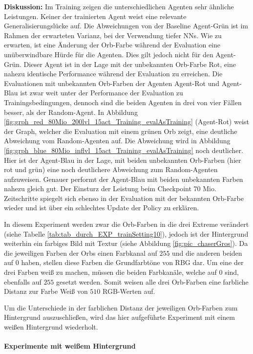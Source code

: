 \textbf{Diskussion:} Im Training zeigen die unterschiedlichen Agenten sehr ähnliche Leistungen. Keiner der trainierten Agent weist eine relevante Generalisierungslücke auf. Die Abweichungen von der Baseline Agent-Grün ist im Rahmen der erwarteten Varianz, bei der Verwendung tiefer NNs. Wie zu erwarten, ist eine Änderung der Orb-Farbe während der Evaluation eine unüberwindbare Hürde für die Agenten. Dies gilt jedoch nicht für den Agent-Grün. Dieser Agent ist in der Lage mit der unbekannten Orb-Farbe Rot, eine nahezu identische Performance während der Evaluation zu erreichen. Die Evaluationen mit unbekannten Orb-Farben der Agenten Agent-Rot und Agent-Blau ist zwar weit unter der Performance der Evaluation zu Trainingsbedingungen, dennoch sind die beiden Agenten in drei von vier Fällen besser, als der Random-Agent. In Abbildung \ref{fig:grph_red_80Mio_200lvl_15act_Training_evalAsTraining} (Agent-Rot) weist der Graph, welcher die Evaluation mit einem grünen Orb zeigt, eine deutliche Abweichung vom Random-Agenten auf. Die Abweichung wird in Abbildung \ref{fig:grph_blue_80Mio_inflvl_15act_Training_evalAsTraining} noch deutlicher. Hier ist der Agent-Blau in der Lage, mit beiden unbekannten Orb-Farben (hier rot und grün) eine noch deutlichere Abweichung zum Random-Agenten aufzuweisen. Genauer performt der Agent-Blau mit beiden unbekannten Farben nahezu gleich gut. Der Einsturz der Leistung beim Checkpoint 70 Mio. Zeitschritte spiegelt sich ebenso in der Evaluation mit der bekannten Orb-Farbe wieder und ist über ein schlechtes Update der Policy zu erklären. 

In diesem Experiment werden zwar die Orb-Farben in die drei Extreme verändert (siehe Tabelle \ref{tab:tab_durch_EXP_trainSetting10}), jedoch ist der Hintergrund weiterhin ein farbiges Bild mit Textur (siehe Abbildung \ref{fig:pic_chaserGros}). Da die jeweiligen Farben der Orbs einen Farbkanal auf $255$ und die anderen beiden auf $0$ haben, stellen diese Farben die Grundfarbtöne von RBG dar. Um eine der drei Farben weiß zu machen, müssen die beiden Farbkanäle, welche auf $0$ sind, ebenfalls auf $255$ gesetzt werden. Somit weisen alle drei Orb-Farben eine farbliche Distanz zur Farbe Weiß von $510$ RGB-Werten auf.

Um die Unterschiede in der farblichen Distanz der jeweiligen Orb-Farben zum Hintergrund auszuschließen, wird das hier aufgeführte Experiment mit einem weißen Hintergrund wiederholt. 


\paragraph{Experimente mit weißem Hintergrund}\label{par:durch_EXP_farbÄnd_weisserHintergrund}

